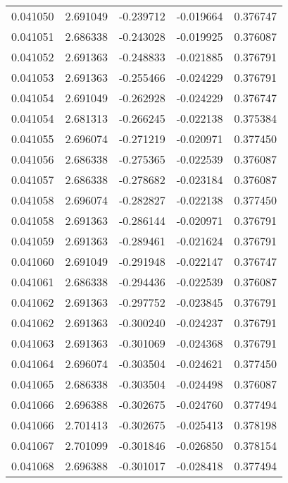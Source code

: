 \begin{tabular}{lrrrr}
0.041050    &  2.691049 & -0.239712 & -0.019664 &             0.376747 \\
0.041051    &  2.686338 & -0.243028 & -0.019925 &             0.376087 \\
0.041052    &  2.691363 & -0.248833 & -0.021885 &             0.376791 \\
0.041053    &  2.691363 & -0.255466 & -0.024229 &             0.376791 \\
0.041054    &  2.691049 & -0.262928 & -0.024229 &             0.376747 \\
0.041054    &  2.681313 & -0.266245 & -0.022138 &             0.375384 \\
0.041055    &  2.696074 & -0.271219 & -0.020971 &             0.377450 \\
0.041056    &  2.686338 & -0.275365 & -0.022539 &             0.376087 \\
0.041057    &  2.686338 & -0.278682 & -0.023184 &             0.376087 \\
0.041058    &  2.696074 & -0.282827 & -0.022138 &             0.377450 \\
0.041058    &  2.691363 & -0.286144 & -0.020971 &             0.376791 \\
0.041059    &  2.691363 & -0.289461 & -0.021624 &             0.376791 \\
0.041060    &  2.691049 & -0.291948 & -0.022147 &             0.376747 \\
0.041061    &  2.686338 & -0.294436 & -0.022539 &             0.376087 \\
0.041062    &  2.691363 & -0.297752 & -0.023845 &             0.376791 \\
0.041062    &  2.691363 & -0.300240 & -0.024237 &             0.376791 \\
0.041063    &  2.691363 & -0.301069 & -0.024368 &             0.376791 \\
0.041064    &  2.696074 & -0.303504 & -0.024621 &             0.377450 \\
0.041065    &  2.686338 & -0.303504 & -0.024498 &             0.376087 \\
0.041066    &  2.696388 & -0.302675 & -0.024760 &             0.377494 \\
0.041066    &  2.701413 & -0.302675 & -0.025413 &             0.378198 \\
0.041067    &  2.701099 & -0.301846 & -0.026850 &             0.378154 \\
0.041068    &  2.696388 & -0.301017 & -0.028418 &             0.377494 \\

\end{tabular}

